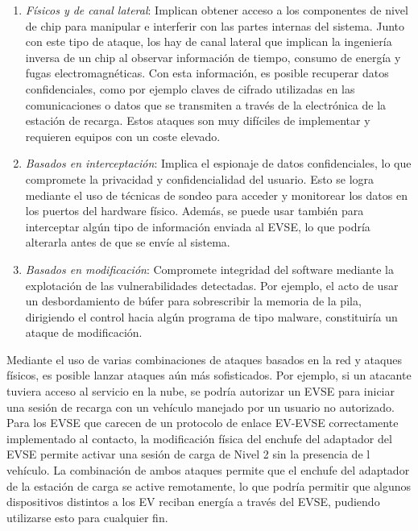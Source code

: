 \documentclass[12pt,a4paper,onecolumn,oneside]{report}
\newcounter{subsubsubsection}[subsubsection]
\begin{document}
\begin{enumerate}

\item \textit{Físicos y de canal lateral}: Implican obtener acceso a los componentes de nivel de chip para manipular e interferir con las partes internas del sistema. Junto con este tipo de ataque, los hay de canal lateral que implican la ingeniería inversa de un chip al observar información de tiempo, consumo de energía y fugas electromagnéticas. Con esta información, es posible recuperar datos confidenciales, como por ejemplo claves de cifrado utilizadas en las comunicaciones o datos que se transmiten a través de la electrónica de la estación de recarga. Estos ataques son muy difíciles de implementar y requieren equipos con un coste elevado.

\item \textit{Basados en interceptación}: Implica el espionaje de datos confidenciales, lo que compromete la privacidad y confidencialidad del usuario. Esto se logra mediante el uso de técnicas de sondeo para acceder y monitorear los datos en los puertos del hardware físico. Además, se puede usar también para interceptar algún tipo de información enviada al EVSE, lo que podría alterarla antes de que se envíe al sistema.

\item \textit{Basados en modificación}: Compromete integridad del software mediante la explotación de las vulnerabilidades detectadas. Por ejemplo, el acto de usar un desbordamiento de búfer para sobrescribir la memoria de la pila, dirigiendo el control hacia algún programa de tipo malware, constituiría un ataque de modificación.

\end{enumerate}




Mediante el uso de varias combinaciones de ataques basados en la red y ataques físicos, es posible lanzar ataques aún más sofisticados. Por ejemplo, si un atacante tuviera acceso al servicio en la nube, se podría autorizar un EVSE para iniciar una sesión de recarga con un vehículo manejado por un usuario no autorizado. Para los EVSE que carecen de un protocolo de enlace EV-EVSE correctamente implementado al contacto, la modificación física del enchufe del adaptador del EVSE permite activar una sesión de carga de Nivel 2 sin la presencia de l vehículo. La combinación de ambos ataques permite que el enchufe del adaptador de la estación de carga se active remotamente, lo que podría permitir que algunos dispositivos distintos a los EV reciban energía a través del EVSE, pudiendo utilizarse esto para cualquier fin.
\end{document}
